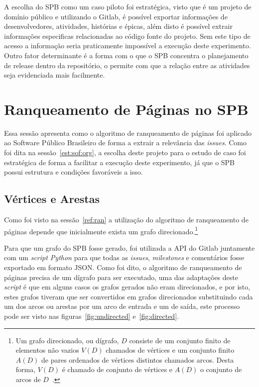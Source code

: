 A escolha do SPB como um caso piloto foi estratégica, visto que é um projeto de 
domínio público e utilizando o Gitlab, é possível exportar informações de
desenvolvedores, atividades, histórias e épicas, além disto é possível extrair
informações especificas relacionadas ao código fonte do projeto. Sem este tipo
de acesso a informação seria praticamente impossível a execução deste experimento.
Outro fator determinante é a forma com o que o SPB concentra o planejamento de release
dentro da repositório, o permite com que a relação entre as atividades seja evidenciada
mais facilmente.

\section{Ranqueamento de Páginas no SPB}
\label{est:ran}

Essa sessão apresenta como o algoritmo de ranqueamento de páginas foi aplicado
ao Software Público Brasileiro de forma a extrair a relevância das \textit{issues}.
Como foi dita na sessão~\ref{est:sof:org}, a escolha deste projeto para o estudo de caso
foi estratégica de forma a facilitar a execução deste experimento, já que o SPB possui 
estrutura e condições favoráveis a isso.

\subsection{Vértices e Arestas}
\label{est:ran:ver}

Como foi visto na sessão~\ref{ref:ran} a utilização do algoritmo de ranqueamento
de páginas depende que inicialmente exista um grafo direcionado.\footnote{Um grafo direcionado, 
ou dígrafo, $D$ consiste de um conjunto finito de elementos não vazios $V(D)$
chamados de vértices e um conjunto finito $A(D)$ de pares ordenados de vértices
distintos chamados arcos. Desta forma, $V(D)$ é chamado de conjunto de vértices e
$A(D)$ o conjunto de arcos de $D$~\cite{bang}.}

Para que um grafo do SPB fosse gerado, foi utilizada a API do Gitlab juntamente
com um \textit{script Python} para que todas as \textit{issues}, \textit{milestones} e
comentários fosse exportado em formato JSON. Como foi dito, o algoritmo de
ranqueamento de páginas precisa de um dígrafo para ser executado, uma das adaptações
deste \textit{script} é que em alguns casos os grafos gerados não eram direcionados,
e por isto, estes grafos tiveram que ser convertidos em grafos direcionados substituindo
cada um dos arcos ou arestas por um arco de entrada e um de saída, este processo pode
ser visto nas figuras~\ref{fig:undirected} e~\ref{fig:directed}.

